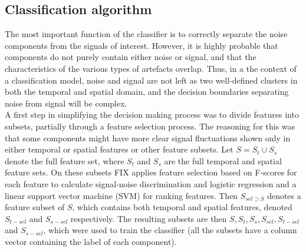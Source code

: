 \subsection{Classification algorithm}

The most important function of the classifier is to correctly separate the noise components from the signals of interest. However, it is highly probable that components do not purely contain either noise or signal, and that the characteristics of the various types of artefacts overlap. Thus, in a the context of a classification model, noise and signal are not left as two well-defined clusters in both the temporal and spatial domain, and the decision boundaries separating noise from signal will be complex. \cite{Salimi-Khorshidi2014} \\
A first step in simplifying the decision making process was to divide features into subsets, partially through a feature selection process. The reasoning for this was that some components might have more clear signal fluctuations shown only in either temporal or spatial features or other feature subsets. Let $S = S_t{\cup}S_s$ denote the full feature set, where $S_t$ and $S_s$ are the full temporal and spatial feature sets. On these subsets FIX applies feature selection based on F-scores for each feature to calculate signal-noise discrimination and logistic regression and a linear support vector machine (SVM) for ranking features. Then $S_{sel{\supset}S}$ denotes a feature subset of $S$, which contains both temporal and spatial features, denoted $S_{t-sel}$ and $S_{s-sel}$ respectively. The resulting subsets are then $S, S_t, S_s, S_{sel}, S_{t-sel}$ and $S_{s-sel}$, which were used to train the classifier (all the subsets have a column vector containing the label of each component). \\
